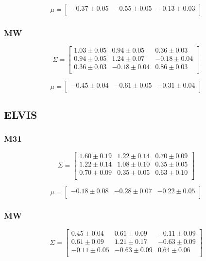 \documentclass[a4paper,fleqn,usenatbib]{mnras}
\begin{document}
\[
\mu= 
\begin{bmatrix}
-0.37\pm 0.05& -0.55\pm 0.05 & -0.13\pm 0.03\\
\end{bmatrix}
\]

\subsubsection{MW}

\[
\Sigma= 
\begin{bmatrix}
 1.03\pm 0.05 & 0.94\pm 0.05  & 0.36\pm 0.03\\
  0.94\pm 0.05 & 1.24\pm 0.07 & -0.18\pm 0.04\\
  0.36\pm 0.03 & -0.18\pm 0.04  & 0.86\pm 0.03\\
\end{bmatrix}
\]

\[
\mu= 
\begin{bmatrix}
-0.45\pm 0.04 & -0.61\pm 0.05 & -0.31\pm 0.04\\
\end{bmatrix}
\]

\subsection{ELVIS}

\subsubsection{M31}

\[
\Sigma= 
\begin{bmatrix}
 1.60\pm 0.19  & 1.22\pm 0.14 & 0.70 \pm 0.09\\
  1.22\pm 0.14 &  1.08\pm 0.10 & 0.35 \pm 0.05\\
  0.70\pm 0.09 & 0.35\pm 0.05  & 0.63 \pm 0.10\\
\end{bmatrix}
\]

\[
\mu= 
\begin{bmatrix}
-0.18\pm 0.08 & -0.28\pm 0.07 &-0.22\pm 0.05\\
\end{bmatrix}
\]

\subsubsection{MW}

\[
\Sigma= 
\begin{bmatrix}
 0.45\pm 0.04 & 0.61\pm0.09 & -0.11\pm0.09 \\
  0.61\pm0.09 & 1.21\pm0.17 & -0.63\pm0.09\\
 -0.11\pm0.05 & -0.63\pm0.09 & 0.64\pm0.06\\
\end{bmatrix}
\]
\end{document}
